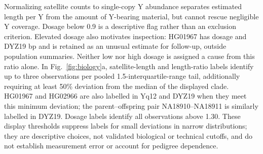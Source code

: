 Normalizing satellite counts to single-copy Y abundance separates estimated length per Y from the amount of Y-bearing material, but cannot rescue negligible Y coverage. Dosage below 0.9 is a descriptive flag rather than an exclusion criterion. Elevated dosage also motivates inspection: HG01967 has dosage  and DYZ19  bp and is retained as an unusual estimate for follow-up, outside population summaries. Neither low nor high dosage is assigned a cause from this ratio alone. In Fig.~\ref{fig:biology}a, satellite-length and length-ratio labels identify up to three observations per pooled 1.5-interquartile-range tail, additionally requiring at least 50\% deviation from the median of the displayed clade. HG01967 and HG02966 are also labelled in Yq12 and DYZ19 when they meet this minimum deviation; the parent--offspring pair NA18910--NA18911 is similarly labelled in DYZ19. Dosage labels identify all observations above 1.30. These display thresholds suppress labels for small deviations in narrow distributions; they are descriptive choices, not validated biological or technical cutoffs, and do not establish measurement error or account for pedigree dependence.

